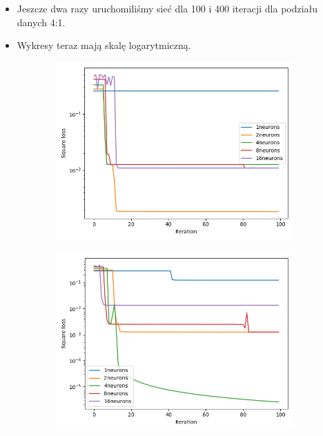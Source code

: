 \documentclass[12pt,a4paper]{article}
\begin{document}
\begin{itemize}
  \item   Jeszcze dwa razy uruchomiliśmy sieć dla 100 i 400 iteracji dla podziału danych 4:1.
  \item   Wykresy teraz mają skalę logarytmiczną.
\end{itemize}

\begin{figure}[h]
  \centering
\begin{subfigure}{0.5\textwidth}
  \includegraphics[width=\linewidth]{charts/double_activation/doubleactiv_100iter.png}
  \caption{}
  \label{}
\end{subfigure}\hfil
\begin{subfigure}{0.5\textwidth}
  \includegraphics[width=\linewidth]{charts/double_activation/doubleactiv_100iter2.png}
  \caption{}
  \label{}
\end{subfigure}


\end{figure}
\end{document}
